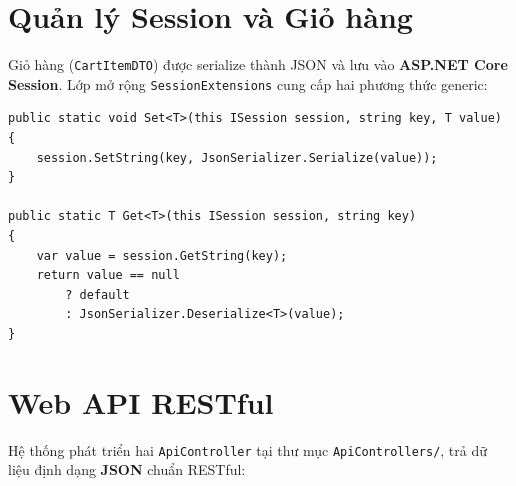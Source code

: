 \documentclass[12pt,a4paper,oneside]{book}
\theoremstyle{plain}
\numberwithin{equation}{chapter}
\begin{document}
\section{Quản lý Session và Giỏ hàng}\label{Sec4.4}

\noindent Giỏ hàng (\texttt{CartItemDTO}) được serialize thành JSON và lưu vào \textbf{ASP.NET Core Session}. Lớp mở rộng \texttt{SessionExtensions} cung cấp hai phương thức generic:

\begin{lstlisting}[style=csharpstyle, caption={\texttt{SessionExtensions.cs} -- Serialize/Deserialize vào Session}]
public static void Set<T>(this ISession session, string key, T value)
{
    session.SetString(key, JsonSerializer.Serialize(value));
}

public static T Get<T>(this ISession session, string key)
{
    var value = session.GetString(key);
    return value == null 
        ? default 
        : JsonSerializer.Deserialize<T>(value);
}
\end{lstlisting}

\section{Web API RESTful}\label{Sec4.5}

\noindent Hệ thống phát triển hai \texttt{ApiController} tại thư mục \texttt{ApiControllers/}, trả dữ liệu định dạng \textbf{JSON} chuẩn RESTful:
\end{document}
